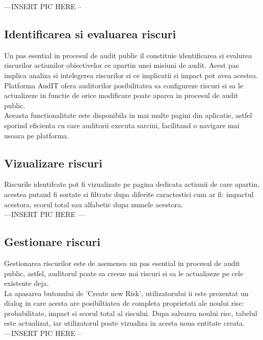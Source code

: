 ---INSERT PIC HERE -- \\



\subsection*{Identificarea si evaluarea riscuri}

Un pas esential in procesul de audit public il constituie identificarea si evalurea riscurilor actiunilor obiectivelor ce apartin unei misiuni de audit. Acest pas implica analiza si intelegerea riscurilor si ce implicatii si impact pot avea acestea.\\
 Platforma AudIT ofera auditorilor posibilitatea sa configureze riscuri si sa le actualizeze in functie de orice modificare poate aparea in procesul de audit public.\\
 Aceasta functionalitate este disponibila in mai multe pagini din aplicatie, astfel sporind eficienta cu care auditorii executa sarcini, facilitand o navigare mai usoara pe platforma.
 
 \subsection*{Vizualizare riscuri}
 Riscurile identifcate pot fi vizualizate pe pagina dedicata actiunii de care apartin, acestea putand fi sortate si filtrate dupa diferite caractestici cum ar fi: impactul acestora, scorul total sau alfabetic dupa numele acestora. \\
 
 ---INSERT PIC HERE --- \\
 
 \subsection*{Gestionare riscuri}
Gestionarea riscurilor este de asemenea un pas esential in procesul de audit public, astfel, auditorul poate sa creeze noi riscuri si sa le actualizeze pe cele existente deja.\\
La apasarea butonului de 'Create new Risk', utilizatorului ii este prezentat un dialog in care acesta are posibiltiatea de completa proprietati ale noului risc: probabilitate, impact si scorul total al riscului. Dupa salvarea noului risc, tabelul este actualizat, iar utilizatorul poate vizualiza in acesta noua entitate creata.\\

---INSERT PIC HERE --\\

